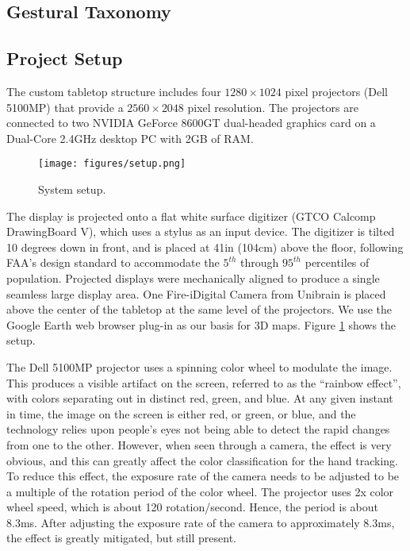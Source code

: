 \subsection{Gestural Taxonomy}

\subsection{Project Setup}
The custom tabletop structure includes four $1280\times1024$ pixel projectors (Dell 5100MP) that provide a $2560\times2048$ pixel resolution. The projectors are connected to two NVIDIA GeForce 8600GT dual-headed graphics card on a Dual-Core 2.4GHz desktop PC with 2GB of RAM.

\begin{figure}
	\centering
	\texttt{[image: figures/setup.png]} 
	\caption{System setup.} \label{fig:setup}
\end{figure}

The display is projected onto a flat white surface digitizer (GTCO Calcomp DrawingBoard V), which uses a stylus as an input device. The digitizer is tilted 10 degrees down in front, and is placed at 41in (104cm) above the floor, following FAA's design standard to accommodate the $5^{th}$ through $95^{th}$ percentiles of population. Projected displays were mechanically aligned to produce a single seamless large display area. One Fire-i\texttrademark Digital Camera from Unibrain is placed above the center of the tabletop at the same level of the projectors. We use the Google Earth web browser plug-in as our basis for 3D maps. Figure \ref{fig:setup} shows the setup.

The Dell 5100MP projector uses a spinning color wheel to modulate the image. This produces a visible artifact on the screen, referred to as the ``rainbow effect'', with colors separating out in distinct red, green, and blue. At any given instant in time, the image on the screen is either red, or green, or blue, and the technology relies upon people's eyes not being able to detect the rapid changes from one to the other. However, when seen through a camera, the effect is very obvious, and this can greatly affect the color classification for the hand tracking. To reduce this effect, the exposure rate of the camera needs to be adjusted to be a multiple of the rotation period of the color wheel. The projector uses 2x color wheel speed, which is about 120 rotation/second. Hence, the period is about 8.3ms. After adjusting the exposure rate of the camera to approximately 8.3ms, the effect is greatly mitigated, but still present. 

